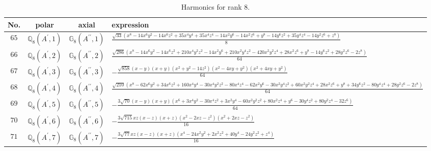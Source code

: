 \documentclass[fleqn,8pt,landscape]{jsarticle}
\begin{document}
\begin{table}[ht!]
\begin{center}
\caption{Harmonics for rank 8.}
\renewcommand{\arraystretch}{1.3}
\begin{tabular}{cccl} \hline \hline
No. & polar & axial & expression \\ \hline
$ 65 $ & $ \mathbb{Q}_{8}(A^{\prime},1) $ & $ \mathbb{G}_{8}(A^{\prime\prime},1) $ & $ \frac{\sqrt{33} \left(x^{8} - 14 x^{6} y^{2} - 14 x^{6} z^{2} + 35 x^{4} y^{4} + 35 x^{4} z^{4} - 14 x^{2} y^{6} - 14 x^{2} z^{6} + y^{8} - 14 y^{6} z^{2} + 35 y^{4} z^{4} - 14 y^{2} z^{6} + z^{8}\right)}{8} $ \\
$ 66 $ & $ \mathbb{Q}_{8}(A^{\prime},2) $ & $ \mathbb{G}_{8}(A^{\prime\prime},2) $ & $ \frac{\sqrt{286} \left(x^{8} - 14 x^{6} y^{2} - 14 x^{6} z^{2} + 210 x^{4} y^{2} z^{2} - 14 x^{2} y^{6} + 210 x^{2} y^{4} z^{2} - 420 x^{2} y^{2} z^{4} + 28 x^{2} z^{6} + y^{8} - 14 y^{6} z^{2} + 28 y^{2} z^{6} - 2 z^{8}\right)}{64} $ \\
$ 67 $ & $ \mathbb{Q}_{8}(A^{\prime},3) $ & $ \mathbb{G}_{8}(A^{\prime\prime},3) $ & $ - \frac{\sqrt{858} \left(x - y\right) \left(x + y\right) \left(x^{2} + y^{2} - 14 z^{2}\right) \left(x^{2} - 4 x y + y^{2}\right) \left(x^{2} + 4 x y + y^{2}\right)}{64} $ \\
$ 68 $ & $ \mathbb{Q}_{8}(A^{\prime},4) $ & $ \mathbb{G}_{8}(A^{\prime\prime},4) $ & $ \frac{\sqrt{210} \left(x^{8} - 62 x^{6} y^{2} + 34 x^{6} z^{2} + 160 x^{4} y^{4} - 30 x^{4} y^{2} z^{2} - 80 x^{4} z^{4} - 62 x^{2} y^{6} - 30 x^{2} y^{4} z^{2} + 60 x^{2} y^{2} z^{4} + 28 x^{2} z^{6} + y^{8} + 34 y^{6} z^{2} - 80 y^{4} z^{4} + 28 y^{2} z^{6} - 2 z^{8}\right)}{64} $ \\
$ 69 $ & $ \mathbb{Q}_{8}(A^{\prime},5) $ & $ \mathbb{G}_{8}(A^{\prime\prime},5) $ & $ - \frac{3 \sqrt{70} \left(x - y\right) \left(x + y\right) \left(x^{6} + 3 x^{4} y^{2} - 30 x^{4} z^{2} + 3 x^{2} y^{4} - 60 x^{2} y^{2} z^{2} + 80 x^{2} z^{4} + y^{6} - 30 y^{4} z^{2} + 80 y^{2} z^{4} - 32 z^{6}\right)}{64} $ \\
$ 70 $ & $ \mathbb{Q}_{8}(A^{\prime},6) $ & $ \mathbb{G}_{8}(A^{\prime\prime},6) $ & $ - \frac{3 \sqrt{715} x z \left(x - z\right) \left(x + z\right) \left(x^{2} - 2 x z - z^{2}\right) \left(x^{2} + 2 x z - z^{2}\right)}{16} $ \\
$ 71 $ & $ \mathbb{Q}_{8}(A^{\prime},7) $ & $ \mathbb{G}_{8}(A^{\prime\prime},7) $ & $ - \frac{3 \sqrt{77} x z \left(x - z\right) \left(x + z\right) \left(x^{4} - 24 x^{2} y^{2} + 2 x^{2} z^{2} + 40 y^{4} - 24 y^{2} z^{2} + z^{4}\right)}{16} $ \\

\end{tabular}
\end{center}
\end{table}
\end{document}

